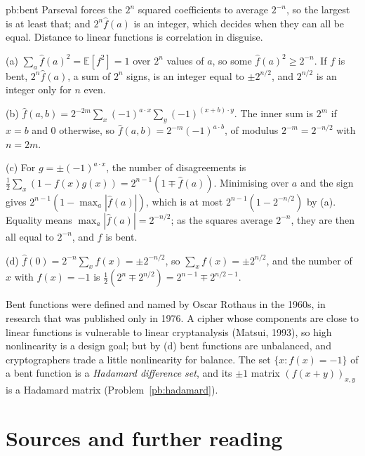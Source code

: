 \begin{solution}{pb:bent}
\idea Parseval forces the $2^n$ squared coefficients to average $2^{-n}$, so the largest is at least that; and $2^n\hat f(a)$ is an integer,
which decides when they can all be equal. Distance to linear functions is correlation in disguise.

\writeup (a) $\sum_a\hat f(a)^2=\mathbb E[f^2]=1$ over $2^n$ values of $a$, so some $\hat f(a)^2\ge2^{-n}$. If $f$ is bent, $2^n\hat f(a)$, a sum of $2^n$ signs, is an
integer equal to $\pm2^{n/2}$, and $2^{n/2}$ is an integer only for $n$ even.

(b) $\hat f(a,b)=2^{-2m}\sum_x(-1)^{a\cdot x}\sum_y(-1)^{(x+b)\cdot y}$. The inner sum is $2^m$ if $x=b$ and $0$ otherwise, so $\hat f(a,b)=2^{-m}(-1)^{a\cdot b}$, of modulus
$2^{-m}=2^{-n/2}$ with $n=2m$.

(c) For $g=\pm(-1)^{a\cdot x}$, the number of disagreements is $\frac12\sum_x(1-f(x)g(x))=2^{n-1}(1\mp\hat f(a))$. Minimising over $a$ and the sign gives
$2^{n-1}(1-\max_a|\hat f(a)|)$, which is at most $2^{n-1}(1-2^{-n/2})$ by (a). Equality means $\max_a|\hat f(a)|=2^{-n/2}$; as the squares average $2^{-n}$,
they are then all equal to $2^{-n}$, and $f$ is bent.

(d) $\hat f(0)=2^{-n}\sum_xf(x)=\pm2^{-n/2}$, so $\sum_xf(x)=\pm2^{n/2}$, and the number of $x$ with $f(x)=-1$ is $\frac12(2^n\mp2^{n/2})=2^{n-1}\mp2^{n/2-1}$.

\leads Bent functions were defined and named by Oscar Rothaus in the 1960s, in research that was published only in 1976. A cipher whose
components are close to linear functions is vulnerable to linear cryptanalysis (Matsui, 1993), so high nonlinearity is a design
goal; but by (d) bent functions are unbalanced, and cryptographers trade a little nonlinearity for balance. The set
$\{x:f(x)=-1\}$ of a bent function is a \emph{Hadamard difference set}, and its $\pm1$ matrix $(f(x+y))_{x,y}$ is a Hadamard matrix
(Problem~\ref{pb:hadamard}).
\end{solution}

\section*{Sources and further reading}

